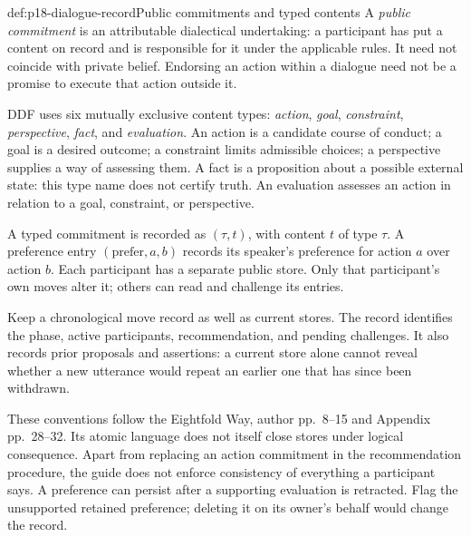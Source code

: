 \begin{hbdefinition}{def:p18-dialogue-record}{Public commitments and typed contents}
A \emph{public commitment} is an attributable dialectical undertaking:
a participant has put a content on record and is responsible for it
under the applicable rules. It need not coincide with private belief.
Endorsing an action within a dialogue need not be a promise to execute
that action outside it.

DDF uses six mutually exclusive content types:
\emph{action}, \emph{goal}, \emph{constraint}, \emph{perspective},
\emph{fact}, and \emph{evaluation}.
An action is a candidate course of conduct; a goal is a desired outcome;
a constraint limits admissible choices; a perspective supplies a way
of assessing them. A fact is a proposition about a possible external
state: this type name does not certify truth. An evaluation assesses
an action in relation to a goal, constraint, or perspective.

A typed commitment is recorded as \((\tau,t)\), with content \(t\)
of type \(\tau\). A preference entry \((\mathrm{prefer},a,b)\) records
its speaker's preference for action \(a\) over action \(b\).
Each participant has a separate public store. Only that participant's
own moves alter it; others can read and challenge its entries.

Keep a chronological move record as well as current stores.
The record identifies the phase, active participants, recommendation,
and pending challenges. It also records prior proposals and assertions:
a current store alone cannot reveal whether a new utterance would
repeat an earlier one that has since been withdrawn.
\end{hbdefinition}

These conventions follow the Eightfold Way, author pp.~8--15 and
Appendix pp.~28--32. Its atomic language does not itself close stores
under logical consequence. Apart from replacing an action commitment
in the recommendation procedure, the guide does not enforce consistency
of everything a participant says. A preference can persist after a
supporting evaluation is retracted. Flag the unsupported retained
preference; deleting it on its owner's behalf would change the record.


